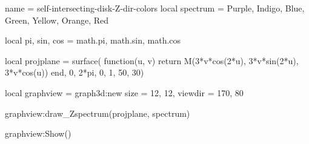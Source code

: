 \documentclass{standalone}
\begin{document}
\begin{luadraw}{name = self-intersecting-disk-Z-dir-colors}
local spectrum = {Purple, Indigo, Blue, Green, Yellow, Orange, Red}

local pi, sin, cos = math.pi, math.sin, math.cos

local projplane = surface(
  function(u, v)
    return M(3*v*cos(2*u), 3*v*sin(2*u), 3*v*cos(u))
  end,
  0, 2*pi, 0, 1,
  {50, 30})

local graphview = graph3d:new{
  size    = {12, 12},
  viewdir = {170, 80}
}

graphview:draw_Zspectrum(projplane, spectrum)

graphview:Show()
\end{luadraw}
\end{document}
